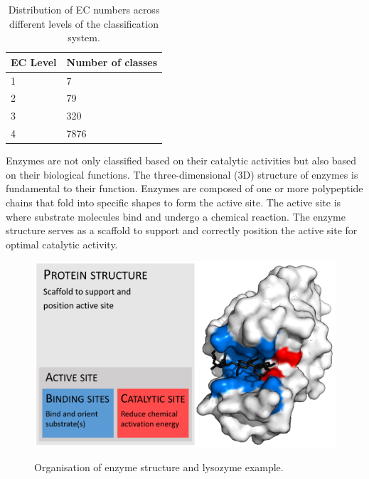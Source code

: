 \begin{table}[hbt]
    \centering
    \begin{tabular}{@{}ll@{}}
    \toprule
    \textbf{EC Level} & \textbf{Number of classes} \\ \midrule
    1                 & 7                          \\
    2                 & 79                         \\
    3                 & 320                        \\
    4                 & 7876                       \\ \bottomrule
    \end{tabular}
    \caption{Distribution of EC numbers across different levels of the classification system.}
    \label{tab:ec-level-distribution}
\end{table}

Enzymes are not only classified based on their catalytic activities but also based on their biological functions. The three-dimensional (3D) structure of enzymes is fundamental to their function. Enzymes are composed of one or more polypeptide chains that fold into specific shapes to form the active site. The active site is where substrate molecules bind and undergo a chemical reaction. The enzyme structure serves as a scaffold to support and correctly position the active site for optimal catalytic activity.

\begin{figure}[hbt]
    \centering
    \begin{minipage}[t]{.7\textwidth}
    \caption{Organisation of enzyme structure and lysozyme example.}
    \includegraphics[width=1\textwidth]{img/EnzymeStructure.svg.png}\\
    \label{fig:EnzymeStructure}
    \end{minipage}
\end{figure}

